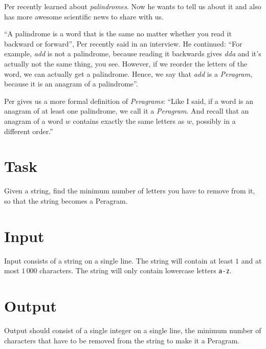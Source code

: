 

Per recently learned about \emph{palindromes}. Now he wants to tell us about it and also has more
awesome scientific news to share with us.

``A palindrome is a word that is the same no matter whether you read it backward or forward'', Per recently
said in an interview. He continued: ``For example, \emph{add} is not a palindrome, because reading
it backwards gives \emph{dda} and it's actually not the same thing, you see. However, if we reorder
the letters of the word, we can actually get a palindrome. Hence, we say that \emph{add} is a
\emph{Peragram}, because it is an anagram of a palindrome''.

Per gives us a more formal definition of \emph{Peragrams}: ``Like I said, if a word is an anagram of
at least one palindrome, we call it a \emph{Peragram}. And recall that an anagram of a word $w$ contains
exactly the same letters as $w$, possibly in a different order.''

\section*{Task}
Given a string, find the minimum number of letters you have to remove from it, so that the string
becomes a Peragram.

\section*{Input}
Input consists of a string on a single line. The string will contain at least $1$ and at most
$1\,000$ characters. The string will only contain lowercase letters \texttt{a-z}.

\section*{Output}
Output should consist of a single integer on a single line, the minimum number of characters that
have to be removed from the string to make it a Peragram.
